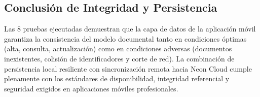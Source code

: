 \documentclass[11pt,a4paper]{article}
\begin{document}
\subsection{Conclusión de Integridad y Persistencia}
Las 8 pruebas ejecutadas demuestran que la capa de datos de la aplicación móvil garantiza la consistencia del modelo documental tanto en condiciones óptimas (alta, consulta, actualización) como en condiciones adversas (documentos inexistentes, colisión de identificadores y corte de red). La combinación de persistencia local resiliente con sincronización remota hacia Neon Cloud cumple plenamente con los estándares de disponibilidad, integridad referencial y seguridad exigidos en aplicaciones móviles profesionales.
\end{document}
